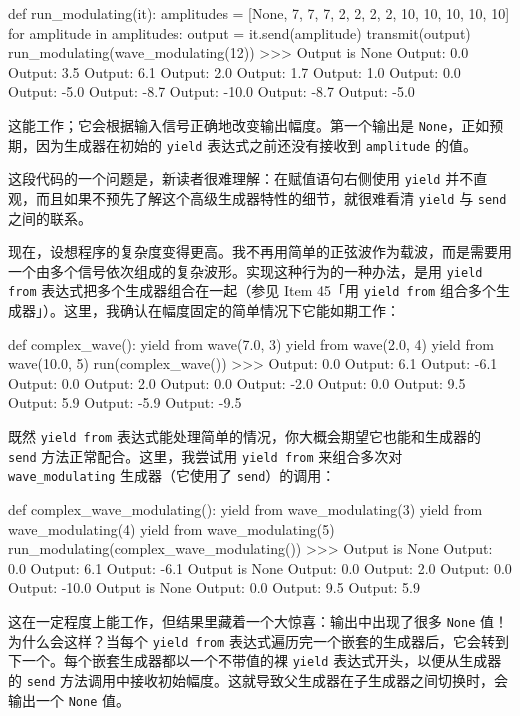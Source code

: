 \begin{codebox}[python]
def run_modulating(it):
    amplitudes = [None, 7, 7, 7, 2, 2, 2, 2, 10, 10, 10, 10, 10]
    for amplitude in amplitudes:
        output = it.send(amplitude)
        transmit(output)
run_modulating(wave_modulating(12))
>>>
Output is None
Output:   0.0
Output:   3.5
Output:   6.1
Output:   2.0
Output:   1.7
Output:   1.0
Output:   0.0
Output:  -5.0
Output:  -8.7
Output: -10.0
Output:  -8.7
Output:  -5.0
\end{codebox}

这能工作；它会根据输入信号正确地改变输出幅度。第一个输出是 \texttt{None}，正如预期，因为生成器在初始的 \texttt{yield} 表达式之前还没有接收到 \texttt{amplitude} 的值。

这段代码的一个问题是，新读者很难理解：在赋值语句右侧使用 \texttt{yield} 并不直观，而且如果不预先了解这个高级生成器特性的细节，就很难看清 \texttt{yield} 与 \texttt{send} 之间的联系。

现在，设想程序的复杂度变得更高。我不再用简单的正弦波作为载波，而是需要用一个由多个信号依次组成的复杂波形。实现这种行为的一种办法，是用 \texttt{yield from} 表达式把多个生成器组合在一起（参见 Item 45「用 \texttt{yield from} 组合多个生成器」）。这里，我确认在幅度固定的简单情况下它能如期工作：

\begin{codebox}[python]
def complex_wave():
    yield from wave(7.0, 3)
    yield from wave(2.0, 4)
    yield from wave(10.0, 5)
run(complex_wave())
>>>
Output:   0.0
Output:   6.1
Output:  -6.1
Output:   0.0
Output:   2.0
Output:   0.0
Output:  -2.0
Output:   0.0
Output:   9.5
Output:   5.9
Output:  -5.9
Output:  -9.5
\end{codebox}

既然 \texttt{yield from} 表达式能处理简单的情况，你大概会期望它也能和生成器的 \texttt{send} 方法正常配合。这里，我尝试用 \texttt{yield from} 来组合多次对 \texttt{wave\_modulating} 生成器（它使用了 \texttt{send}）的调用：

\begin{codebox}[python]
def complex_wave_modulating():
    yield from wave_modulating(3)
    yield from wave_modulating(4)
    yield from wave_modulating(5)
run_modulating(complex_wave_modulating())
>>>
Output is None
Output:   0.0
Output:   6.1
Output:  -6.1
Output is None
Output:   0.0
Output:   2.0
Output:   0.0
Output: -10.0
Output is None
Output:   0.0
Output:   9.5
Output:   5.9
\end{codebox}

这在一定程度上能工作，但结果里藏着一个大惊喜：输出中出现了很多 \texttt{None} 值！为什么会这样？当每个 \texttt{yield from} 表达式遍历完一个嵌套的生成器后，它会转到下一个。每个嵌套生成器都以一个不带值的裸 \texttt{yield} 表达式开头，以便从生成器的 \texttt{send} 方法调用中接收初始幅度。这就导致父生成器在子生成器之间切换时，会输出一个 \texttt{None} 值。

